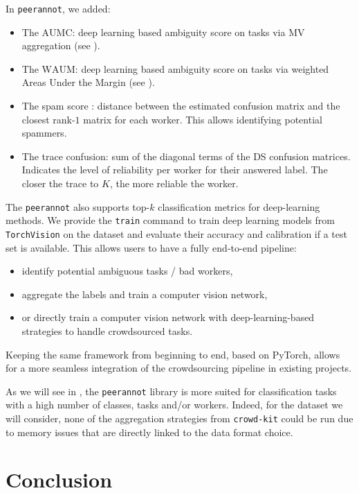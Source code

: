 In \texttt{peerannot}, we added:
\begin{itemize}
    \item The $\mathrm{AUMC}$: deep learning based ambiguity score on tasks via MV aggregation (see ).
    \item The $\mathrm{WAUM}$: deep learning based ambiguity score on tasks via weighted Areas Under the Margin (see ).
    \item The spam score \citep{raykar_ranking_2011}: distance between the estimated confusion matrix and the closest rank-$1$ matrix for each worker. This allows identifying potential spammers.
    \item The trace confusion: sum of the diagonal terms of the DS confusion matrices. Indicates the level of reliability per worker for their answered label. The closer the trace to $K$, the more reliable the worker.
\end{itemize}

The \texttt{peerannot} also supports top-$k$ classification metrics for deep-learning methods.
We provide the \texttt{train} command to train deep learning models from \texttt{TorchVision} on the dataset and evaluate their accuracy and calibration if a test set is available. This allows users to have a fully end-to-end pipeline:
\begin{itemize}
    \item identify potential ambiguous tasks / bad workers,
    \item aggregate the labels and train a computer vision network,
    \item or directly train a computer vision network with deep-learning-based strategies to handle crowdsourced tasks.
\end{itemize}
Keeping the same framework from beginning to end, based on PyTorch, allows for a more seamless integration of the crowdsourcing pipeline in existing projects.

As we will see in , the \texttt{peerannot} library is more suited for classification tasks with a high number of classes, tasks and/or workers. Indeed, for the dataset we will consider, none of the aggregation strategies from \texttt{crowd-kit} could be run due to memory issues that are directly linked to the data format choice.

\section{Conclusion}

